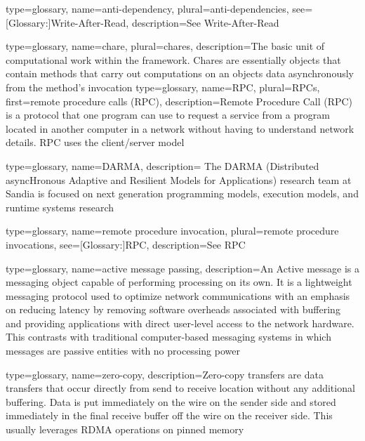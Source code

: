 {
  type=glossary,
  name={anti-dependency},
  plural={anti-dependencies},
  see={[Glossary:]{Write-After-Read}},
  description={See \gls{Write-After-Read}}
}

{
  type=glossary,
  name={chare},
  plural={chares},
  description={The basic unit of computational work within the \Charm{} framework. Chares are essentially \protect\CC{} objects that contain methods that carry out computations on an objects data asynchronously from the method's invocation}
}
{
  type=glossary,
  name={RPC},
  plural={RPCs},
  first={remote procedure calls (RPC)},
  description={Remote Procedure Call (RPC) is a protocol that one
  program can use to request a service from a program located in
  another computer in a network without having to understand network
  details. RPC uses the client/server model}
}

{
  type=glossary,
  name={DARMA},
  description={ The DARMA (Distributed asyncHronous Adaptive and Resilient Models for
    Applications) research team at Sandia is focused on next generation \glspl{programming
    model}, \glspl{execution model}, and \glspl{runtime system} research}
}

{
  type=glossary,
  name={remote procedure invocation},
  plural={remote procedure invocations},
  see={[Glossary:]{RPC}},
  description={See RPC}
}

{
  type=glossary,
  name={active message passing},
  description={An Active message is a messaging object
  capable of performing processing on its own. It is a lightweight
  messaging protocol used to optimize network communications with an
  emphasis on reducing latency by removing software overheads
  associated with buffering and providing applications with direct
  user-level access to the network hardware. This contrasts with
  traditional computer-based messaging systems in which messages are
  passive entities with no processing power}
}

{
  type={glossary},
  name={zero-copy},
  description={Zero-copy transfers are data transfers that occur directly from send to receive location without any additional buffering. Data is put immediately on the wire on the sender side and stored immediately in the final receive buffer off the wire on the receiver side. This usually leverages \gls{RDMA} operations on pinned memory}
}

